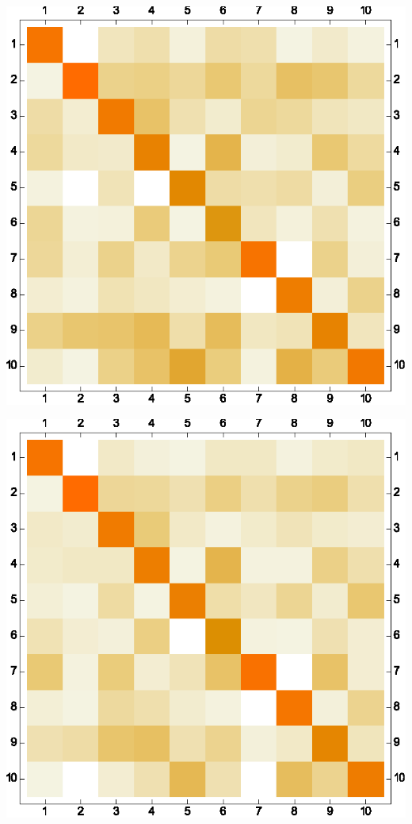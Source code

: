 \documentclass[letter]{article}
\begin{document}
\includegraphics{GRAPHS_gr3.eps}

\includegraphics{GRAPHS_gr4.eps}
\end{document}
